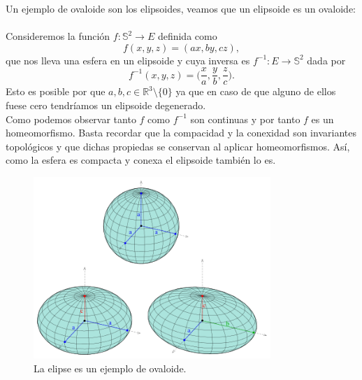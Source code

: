 \begin{ejemplo} 
	
	Un ejemplo de ovaloide son los elipsoides, veamos que un elipsoide es un ovaloide:
${ }$\\

	Consideremos la función $f : \mathbb{S}^2 \to E$ definida como
	\[
		f(x,y,z) = (ax,by,cz),
	\]
	que nos lleva una esfera en un elipsoide y cuya inversa es $f^{-1} : E \to \mathbb{S}^2$ dada por
	\[
		f^{-1} (x,y,z) = \Big(\frac x a, \frac y b, \frac z c \Big).
	\]
	Esto es posible por que $a,b,c \in \mathbb{R}^3 \setminus \{0\}$ ya que en caso de que alguno de ellos fuese cero tendríamos un elipsoide degenerado.
	${ }$\\
	
	Como podemos observar tanto $f$ como $f^{-1}$ son continuas y por tanto $f$ es un homeomorfismo. Basta recordar que la compacidad y la conexidad son invariantes topológicos y que dichas propiedas se conservan al aplicar homeomorfismos. Así, como la esfera es compacta y conexa el elipsoide también lo es.
	
	
	
		\begin{figure}[h]
			\begin{center}
				\includegraphics[width=0.8\textwidth]{imagenes/ellipsoid.png}
			\end{center}
			\caption{La elipse es un ejemplo de ovaloide.}
			\label{fig:etiq_3}
		\end{figure}
		

\end{ejemplo}

